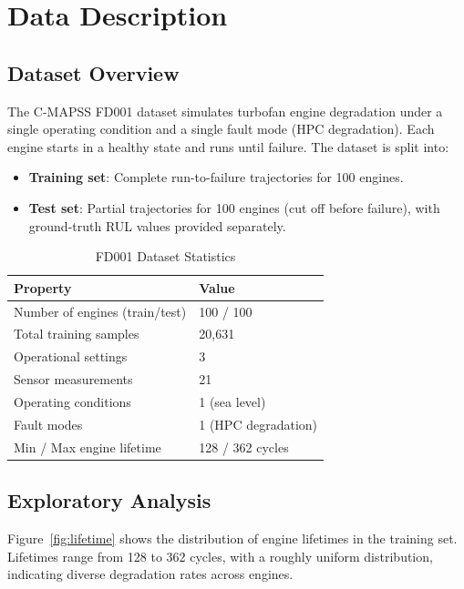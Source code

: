 \documentclass[11pt, a4paper]{article}
\begin{document}
\section{Data Description}

\subsection{Dataset Overview}

The C-MAPSS FD001 dataset simulates turbofan engine degradation under a single operating condition and a single fault mode (HPC degradation). Each engine starts in a healthy state and runs until failure. The dataset is split into:

\begin{itemize}[nosep]
    \item \textbf{Training set}: Complete run-to-failure trajectories for 100 engines.
    \item \textbf{Test set}: Partial trajectories for 100 engines (cut off before failure), with ground-truth RUL values provided separately.
\end{itemize}

\begin{table}[H]
\centering
\caption{FD001 Dataset Statistics}
\label{tab:dataset}
\begin{tabular}{ll}
\toprule
\textbf{Property} & \textbf{Value} \\
\midrule
Number of engines (train/test) & 100 / 100 \\
Total training samples & 20{,}631 \\
Operational settings & 3 \\
Sensor measurements & 21 \\
Operating conditions & 1 (sea level) \\
Fault modes & 1 (HPC degradation) \\
Min / Max engine lifetime & 128 / 362 cycles \\
\bottomrule
\end{tabular}
\end{table}

\subsection{Exploratory Analysis}

Figure~\ref{fig:lifetime} shows the distribution of engine lifetimes in the training set. Lifetimes range from 128 to 362 cycles, with a roughly uniform distribution, indicating diverse degradation rates across engines.
\end{document}
